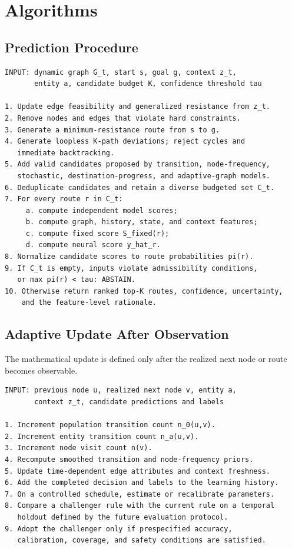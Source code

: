 \documentclass[11pt,letterpaper]{article}
\begin{document}
\section{Algorithms}

\subsection{Prediction Procedure}

\begin{lstlisting}[style=pseudocode,caption={Abstract two-tier route-prediction procedure.}]
INPUT: dynamic graph G_t, start s, goal g, context z_t,
       entity a, candidate budget K, confidence threshold tau

1. Update edge feasibility and generalized resistance from z_t.
2. Remove nodes and edges that violate hard constraints.
3. Generate a minimum-resistance route from s to g.
4. Generate loopless K-path deviations; reject cycles and
   immediate backtracking.
5. Add valid candidates proposed by transition, node-frequency,
   stochastic, destination-progress, and adaptive-graph models.
6. Deduplicate candidates and retain a diverse budgeted set C_t.
7. For every route r in C_t:
     a. compute independent model scores;
     b. compute graph, history, state, and context features;
     c. compute fixed score S_fixed(r);
     d. compute neural score y_hat_r.
8. Normalize candidate scores to route probabilities pi(r).
9. If C_t is empty, inputs violate admissibility conditions,
   or max pi(r) < tau: ABSTAIN.
10. Otherwise return ranked top-K routes, confidence, uncertainty,
    and the feature-level rationale.
\end{lstlisting}

\subsection{Adaptive Update After Observation}

The mathematical update is defined only after the realized next node or route becomes observable.

\begin{lstlisting}[style=pseudocode,caption={Abstract behavioural and graph update.}]
INPUT: previous node u, realized next node v, entity a,
       context z_t, candidate predictions and labels

1. Increment population transition count n_0(u,v).
2. Increment entity transition count n_a(u,v).
3. Increment node visit count n(v).
4. Recompute smoothed transition and node-frequency priors.
5. Update time-dependent edge attributes and context freshness.
6. Add the completed decision and labels to the learning history.
7. On a controlled schedule, estimate or recalibrate parameters.
8. Compare a challenger rule with the current rule on a temporal
   holdout defined by the future evaluation protocol.
9. Adopt the challenger only if prespecified accuracy,
   calibration, coverage, and safety conditions are satisfied.
\end{lstlisting}
\end{document}

